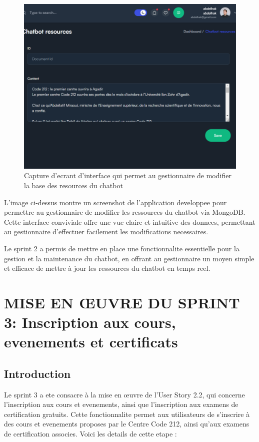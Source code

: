 \documentclass[a4paper, 11pt, openany]{report}
\begin{document}
\begin{figure}[H]
\centering
\includegraphics[width=\textwidth]{admin-doc.png} 
\caption{Capture d'ecrant d'interface qui permet au gestionnaire de modifier la base des resources du chatbot}
\label{fig:screen_chat_res}
\end{figure}

L'image ci-dessus montre un screenshot de l'application developpee pour permettre au gestionnaire de modifier les ressources du chatbot via MongoDB. Cette interface conviviale offre une vue claire et intuitive des donnees, permettant au gestionnaire d'effectuer facilement les modifications necessaires.

Le sprint 2 a permis de mettre en place une fonctionnalite essentielle pour la gestion et la maintenance du chatbot, en offrant au gestionnaire un moyen simple et efficace de mettre à jour les ressources du chatbot en temps reel.

\newpage


\chapter{MISE EN ŒUVRE DU SPRINT 3: Inscription aux cours, evenements et certificats}
\section{Introduction}

Le sprint 3 a ete consacre à la mise en œuvre de l'User Story 2.2, qui concerne l'inscription aux cours et evenements, ainsi que l'inscription aux examens de certification gratuits. Cette fonctionnalite permet aux utilisateurs de s'inscrire à des cours et evenements proposes par le Centre Code 212, ainsi qu'aux examens de certification associes. Voici les details de cette etape :
\end{document}
